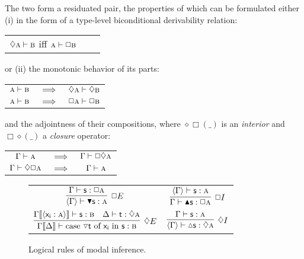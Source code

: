 The two form a residuated pair, the properties of which can be formulated either (i) in the form of a type-level biconditional derivability relation:
\begin{center}
	\begin{tabularx}{0.35\textwidth}{@{}ccc@{}}
	$\diamond \prop{A} \vdash \prop{B}$ iff $\prop{A} \vdash \Box\prop{B}$
	\end{tabularx}
\end{center}
or (ii) the monotonic behavior of its parts:
\begin{center}
	\begin{tabularx}{0.35\textwidth}{@{}ccc@{}}
		$\prop{A} \vdash \prop{B}$ & $\implies$ & $\diamond \prop{A}\vdash \diamond\prop{B}$\\
		$\prop{A} \vdash \prop{B}$ & $\implies$ & $ \Box{\prop{A}}\vdash \Box\prop{B}$\\
	\end{tabularx}
\end{center}
and the adjointness of their compositions, where $\diamond\Box(\_)$ is an \textit{interior} and $\Box\diamond(\_)$ a \textit{closure} operator:
\begin{center}
	\begin{tabularx}{0.35\textwidth}{@{}ccc@{}}
		$\Gamma \vdash \prop{A}$ & $\implies$ & $\Gamma \vdash \Box\diamond\prop{A}$\\
		$\Gamma \vdash \diamond\Box\prop{A}$ & $\implies$ & $ \Gamma \vdash \prop{A}$\\
	\end{tabularx}
\end{center}

\begin{figure}
	\centering
	\begin{tabularx}{0.9875\textwidth}{@{}CC@{}}
		$\infer[\Box E]{\bracket{\Gamma} \vdash \boxelim{\term{s}}: \prop{A}}{
			\Gamma \vdash \term{s}: \Box\prop{A}
		}$
		&
		$\infer[\Box I]{\Gamma \vdash \boxintro{\term{s}}:\Box\prop{A}}{
			\bracket{\Gamma} \vdash \term{s}:\prop{A}
		}$
		\\[\smallsep]
		$\infer[\diamond E]{\Gamma\ctx{\Delta} \vdash \cterm{case \term{\diaelim t} of \term{x_i } in \term{s}}: \prop{B}}{
			\Gamma\ctx{\bracket{\term{x_i }:\prop{A}}}\vdash\term{s}:\prop{B}
			&
			\Delta \vdash \term{t}:\diamond\prop{A}
		}
		$
		&
		$\infer[\diamond I]{\bracket{\Gamma} \vdash \diaintro{\term{s}}: \diamond \prop{A}}{
			\Gamma \vdash \term{s}:\prop{A}
		}$
	\end{tabularx}
	\caption{Logical rules of modal inference.}
	\label{figure:modal_logical}
\end{figure}


